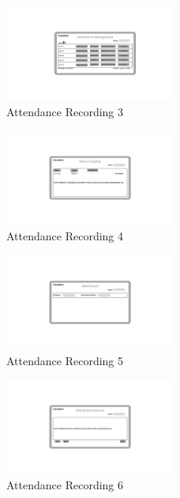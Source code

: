 \documentclass[letterpaper,12pt,oneside,listof=totoc]{scrreprt}
\begin{document}
\begin{figure}[htbp]
  \centering
  \includegraphics[width=0.5\textwidth]{Attendence_recording3.png}
  \caption{Attendance Recording 3}
\end{figure}

\begin{figure}[htbp]
  \centering
  \includegraphics[width=0.5\textwidth]{Attendence_recording4.png}
  \caption{Attendance Recording 4}
\end{figure}

\begin{figure}[htbp]
  \centering
  \includegraphics[width=0.5\textwidth]{Attendence_recording5.png}
  \caption{Attendance Recording 5}
\end{figure}

\begin{figure}[htbp]
  \centering
  \includegraphics[width=0.5\textwidth]{Attendence_recording6.png}
  \caption{Attendance Recording 6}
\end{figure}
\end{document}
